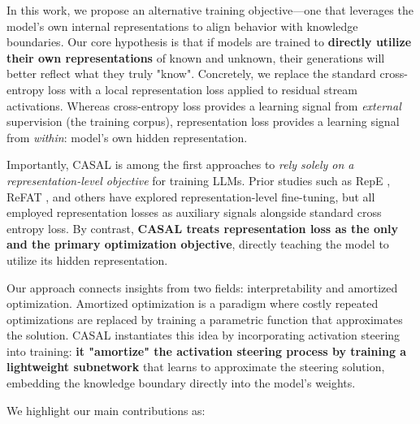\documentclass{article} %
\begin{document}
In this work, we propose an alternative training objective—one that leverages the model's own internal representations to align behavior with knowledge boundaries. Our core hypothesis is that if models are trained to\textbf{ directly utilize their own representations} of known and unknown, their generations will better reflect what they truly "know". Concretely, we replace the standard cross-entropy loss with a local representation loss applied to residual stream activations. Whereas cross-entropy loss provides a learning signal from \textit{external} supervision (the training corpus), representation loss provides a learning signal from \textit{within}: model's own hidden representation. 

Importantly, CASAL is among the first approaches to \emph{rely solely on a representation-level objective} for training LLMs. Prior studies such as RepE \citep{zou2025representationengineering}, ReFAT \citep{yu2024refat}, and others \citep{yu2024mechanistic, ablationfinetuning, chen2025personavectors, representationbending} have explored representation-level fine-tuning, but all employed representation losses as auxiliary signals alongside standard cross entropy loss. By contrast, \textbf{CASAL treats representation loss as the only and the primary optimization objective}, directly teaching the model to utilize its hidden representation.

Our approach connects insights from two fields: interpretability and amortized optimization. Amortized optimization \citep{kingma2013auto, rezende2014stochastic, gershman2014amortized} is a paradigm where costly repeated optimizations are replaced by training a parametric function that approximates the solution. CASAL instantiates this idea by incorporating activation steering into training: \textbf{it "amortize" the activation steering process by training a lightweight subnetwork} that learns to approximate the steering solution, embedding the knowledge boundary directly into the model's weights.

We highlight our main contributions as:
\end{document}
